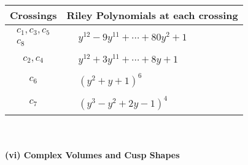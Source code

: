 \documentclass[1p]{elsarticle_modified}
\theoremstyle{definition}
\begin{document}
\begin{tabular}{m{50pt}|m{274pt}}
Crossings & \hspace{64pt}Riley Polynomials at each crossing \\
\hline $$\begin{aligned}c_{1},c_{3},c_{5}\\c_{8}\end{aligned}$$&$\begin{aligned}
&y^{12}-9 y^{11}+\cdots+80 y^2+1
\end{aligned}$\\
\hline $$\begin{aligned}c_{2},c_{4}\end{aligned}$$&$\begin{aligned}
&y^{12}+3 y^{11}+\cdots+8 y+1
\end{aligned}$\\
\hline $$\begin{aligned}c_{6}\end{aligned}$$&$\begin{aligned}
&(y^2+y+1)^6
\end{aligned}$\\
\hline $$\begin{aligned}c_{7}\end{aligned}$$&$\begin{aligned}
&(y^3- y^2+2 y-1)^4
\end{aligned}$\\
\hline
\end{tabular}\\~\\
\newpage\flushleft \textbf{(vi) Complex Volumes and Cusp Shapes}
\end{document}

